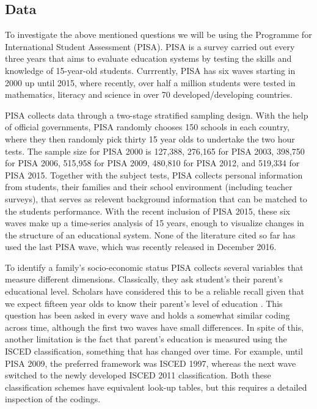 \documentclass[11pt, a4paper]{article}\usepackage[]{graphicx}\usepackage[]{color}
\begin{document}
\subsection{Data}



To investigate the above mentioned questions we will be using the Programme for International Student Assessment (PISA). PISA is a survey carried out every three years that aims to evaluate education systems by testing the skills and knowledge of 15-year-old students. Currrently, PISA has six waves starting in 2000 up until 2015, where recently, over half a million students were tested in mathematics, literacy and science in over 70 developed/developing countries.

PISA collects data through a two-stage stratified sampling design. With the help of official governments, PISA randomly chooses 150 schools in each country, where they then randomly pick thirty 15 year olds to undertake the two hour tests. The sample size for PISA 2000 is 127,388, 276,165 for PISA 2003, 398,750 for PISA 2006, 515,958 for PISA 2009, 480,810 for PISA 2012, and 519,334 for PISA 2015. Together with the subject tests, PISA collects personal information from students, their families and their school environment (including teacher surveys), that serves as relevent background information that can be matched to the students performance. With the recent inclusion of PISA 2015, these six waves make up a time-series analysis of 15 years, enough to visualize changes in the structure of an educational system. None of the literature cited so far has used the last PISA wave, which was recently released in December 2016.

To identify a family's socio-economic status PISA collects several variables that measure different dimensions. Classically, they ask student's their parent's educational level. Scholars have considered this to be a reliable recall given that we expect fifteen year olds to know their parent's level of education \citep{reardon2011}. This question has been asked in every wave and holds a somewhat similar coding across time, although the first two waves have small differences. In spite of this, another limitation is the fact that parent's education is measured using the ISCED classification, something that has changed over time. For example, until PISA 2009, the preferred framework was ISCED 1997, whereas the next wave switched to the newly developed ISCED 2011 classification. Both these classification schemes have equivalent look-up tables, but this requires a detailed inspection of the codings.
\end{document}
